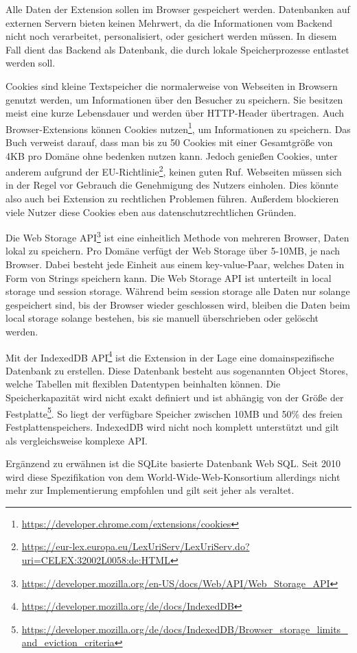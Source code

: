 Alle Daten der Extension sollen im Browser gespeichert werden. Datenbanken auf externen Servern bieten keinen Mehrwert, da die Informationen vom Backend nicht noch verarbeitet, personalisiert, oder gesichert werden müssen. In diesem Fall dient das Backend als Datenbank, die durch lokale Speicherprozesse entlastet werden soll.

Cookies sind kleine Textspeicher die normalerweise von Webseiten in Browsern genutzt werden, um Informationen über den Besucher zu speichern. Sie besitzen meist eine kurze Lebensdauer und werden über HTTP-Header übertragen. Auch Browser-Extensions können Cookies nutzen\footnote{\url{https://developer.chrome.com/extensions/cookies}}, um Informationen zu speichern. Das Buch verweist darauf, dass man bis zu 50 Cookies mit einer Gesamtgröße von 4KB pro Domäne ohne bedenken nutzen kann.
Jedoch genießen Cookies, unter anderem aufgrund der EU-Richtlinie\footnote{\url{https://eur-lex.europa.eu/LexUriServ/LexUriServ.do?uri=CELEX:32002L0058:de:HTML}}, keinen guten Ruf. Webseiten müssen sich in der Regel vor Gebrauch die Genehmigung des Nutzers einholen. Dies könnte also auch bei Extension zu rechtlichen Problemen führen. Außerdem blockieren viele Nutzer diese Cookies eben aus datenschutzrechtlichen Gründen.

Die Web Storage API\footnote{\url{https://developer.mozilla.org/en-US/docs/Web/API/Web_Storage_API}} ist eine einheitlich Methode von mehreren Browser, Daten lokal zu speichern. Pro Domäne verfügt der Web Storage über 5-10MB, je nach Browser. Dabei besteht jede Einheit aus einem key-value-Paar, welches Daten in Form von Strings speichern kann. Die Web Storage API ist unterteilt in \glqq local storage\grqq{} und \glqq session storage\grqq{}. Während beim session storage alle Daten nur solange gespeichert sind, bis der Browser wieder geschlossen wird, bleiben die Daten beim local storage solange bestehen, bis sie manuell überschrieben oder gelöscht werden.

Mit der IndexedDB API\footnote{\url{https://developer.mozilla.org/de/docs/IndexedDB}} ist die Extension in der Lage eine domainspezifische Datenbank zu erstellen. Diese Datenbank besteht aus sogenannten \glqq Object Stores\grqq{}, welche Tabellen mit flexiblen Datentypen beinhalten können. Die Speicherkapazität wird nicht exakt definiert und ist abhängig von der Größe der Festplatte\footnote{\url{https://developer.mozilla.org/de/docs/IndexedDB/Browser_storage_limits_and_eviction_criteria}}. So liegt der verfügbare Speicher zwischen 10MB und 50\% des freien Festplattenspeichers. IndexedDB wird nicht noch komplett unterstützt und gilt als vergleichsweise komplexe API.

Ergänzend zu erwähnen ist die SQLite basierte Datenbank Web SQL. Seit 2010 wird diese Spezifikation von dem World-Wide-Web-Konsortium allerdings nicht mehr zur Implementierung empfohlen und gilt seit jeher als veraltet.
















